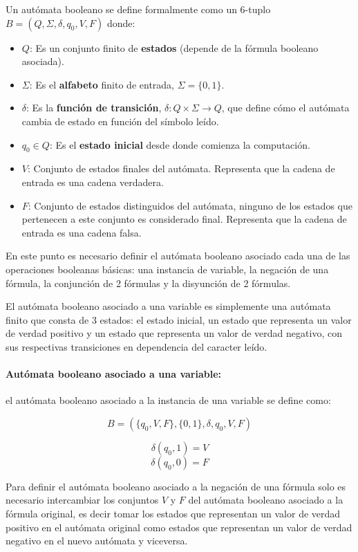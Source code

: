 \documentclass[12pt]{article}
\begin{document}
Un autómata booleano \cite{aCFSAT} se define formalmente como un 6-tuplo $B=(Q,\Sigma,\delta,q_0,V,F)$ donde:

\begin{itemize}
      \item $Q$: Es un conjunto finito de \textbf{estados} (depende de la fórmula booleano asociada).
      \item $\Sigma$: Es el \textbf{alfabeto} finito de entrada, $\Sigma =\{0,1\}$.
      \item $\delta$: Es la \textbf{función de transición}, $\delta: Q \times \Sigma \to Q$, que define cómo el autómata cambia de estado en función del símbolo leído.
      \item $q_0 \in Q$: Es el \textbf{estado inicial} desde donde comienza la computación.
      \item  $V$: Conjunto de estados finales del autómata. Representa que la cadena de entrada es una cadena verdadera.
      \item  $F$: Conjunto de estados distinguidos del autómata, ninguno de los estados que pertenecen a este conjunto es considerado final.
            Representa que la cadena de entrada es una cadena falsa.
            
\end{itemize}

En este punto es necesario definir el autómata booleano asociado cada una de las operaciones booleanas básicas: una instancia de 
variable, la negación de una fórmula, la conjunción de 2 fórmulas y la disyunción de 2 fórmulas.

El autómata booleano asociado a una variable es simplemente una autómata finito que consta de 3 estados: el estado inicial, un estado
que representa un valor de verdad positivo y un estado que representa un valor de verdad negativo, con sus respectivas transiciones en
dependencia del caracter leído.

\paragraph{Autómata booleano asociado a una variable:} el autómata booleano asociado a la instancia de una variable
se define como:

$$B=(\{q_0,V,F\},\{0,1\},\delta,q_0,V,F)$$

$$\delta(q_0,1)=V$$
$$\delta(q_0,0)=F$$

Para definir el autómata booleano asociado a la negación de una fórmula solo es necesario intercambiar los conjuntos $V$ y $F$ del
autómata booleano asociado a la fórmula original, es decir tomar los estados que representan un valor de verdad positivo en el autómata
original como estados que representan un valor de verdad negativo en el nuevo autómata y viceversa.  
\end{document}
